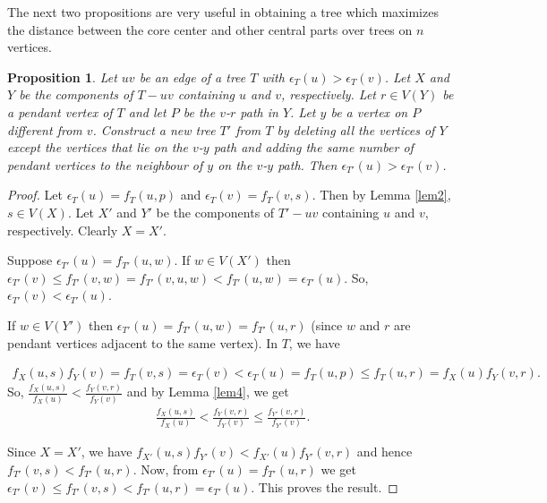 \documentclass[10pt,a4paper]{amsart}
\newtheorem{proposition}[theorem]{Proposition}
\begin{document}
The next two propositions are very useful in obtaining a tree which maximizes the distance between the core center and other central parts over trees on $n$ vertices.
\begin{proposition} \label{prop4}
Let $uv$ be an edge of a tree $T$ with $\epsilon_{T}(u)>\epsilon_{T}(v)$. Let $X$ and $Y$ be the components of $T-uv$ containing $u$ and $v$, respectively. Let $r\in V(Y)$ be a pendant vertex of $T$ and let $P$ be the $v$-$r$ path in $Y$. Let $y$ be a vertex on $P$ different from $v$. Construct a new tree $T'$ from $T$ by deleting all the vertices of $Y$ except the vertices that lie on the $v$-$y$ path and adding the same number of pendant vertices to the neighbour of $y$ on the $v$-$y$ path. Then $\epsilon_{T'}(u)>\epsilon_{T'}(v)$.   
\end{proposition}
\begin{proof}
Let $\epsilon_{T}(u)=f_T(u,p)$ and $\epsilon_{T}(v)=f_T(v,s)$. Then by Lemma \ref{lem2}, $s\in V(X).$ Let $X'$ and $Y'$ be the components of $T'-uv$ containing $u$ and $v$, respectively. Clearly $X=X'$.

Suppose $\epsilon_{T'}(u)=f_{T'}(u,w)$. If $w\in V(X')$ then ${\epsilon}_{T'}(v)\leq f_{T'}(v,w)=f_{T'}(v,u,w)<f_{T'}(u,w)={\epsilon}_{T'}(u)$.
So,  ${\epsilon}_{T'}(v)< {\epsilon}_{T'}(u)$.

If $w\in V(Y')$ then $\epsilon_{T'}(u)=f_{T'}(u,w)=f_{T'}(u,r)$ (since $w$ and $r$ are pendant vertices adjacent to the same vertex). In $T$, we have

\begin{align*}
 f_X(u,s)f_Y(v)=f_T(v,s)= \epsilon_T(v)<\epsilon_T(u)=f_T(u,p)\leq f_T(u,r)=f_X(u)f_Y(v,r).
\end{align*}
So, $\frac{f_X(u,s)}{f_X(u)}<\frac{f_Y(v,r)}{f_Y(v)}$ and by Lemma \ref{lem4}, we get
\begin{align*}
  \frac{f_X(u,s)}{f_X(u)}<\frac{f_Y(v,r)}{f_Y(v)}  \leq \frac{f_{Y'}(v,r)}{f_{Y'}(v)}.
\end{align*}
 
Since $X=X'$, we have $f_{X'}(u,s)f_{Y'}(v)< f_{X'}(u)f_{Y'}(v,r)$ and hence $f_{T'}(v,s)<f_{T'}(u,r)$. Now, from  $\epsilon_{T'}(u)=f_{T'}(u,r)$ we get $\epsilon_{T'}(v)\leq f_{T'}(v,s)<f_{T'}(u,r)=\epsilon_{T'}(u)$. This proves the result.
\end{proof}
\end{document}

